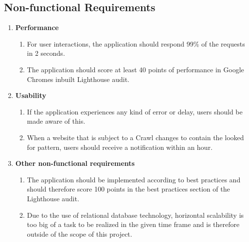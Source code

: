 \documentclass[titlepage, 12pt]{article}
\begin{document}
\subsection{Non-functional Requirements}

\begin{enumerate}
  \item \textbf{Performance}
        \begin{enumerate}
          \item For user interactions, the application should respond 99\% of the requests in 2 seconds.
          \item The application should score at least 40 points of performance in Google Chromes inbuilt Lighthouse audit.
        \end{enumerate}
  \item \textbf{Usability}
        \begin{enumerate}
          \item If the application experiences any kind of error or delay, users should be made aware of this.
          \item When a website that is subject to a Crawl changes to contain the looked for pattern, users should receive a notification within an hour.
        \end{enumerate}
  \item \textbf{Other non-functional requirements}
        \begin{enumerate}
          \item The application should be implemented according to best practices and should therefore score 100 points in the best practices section of the Lighthouse audit.
          \item Due to the use of relational database technology, horizontal scalability is too big of a task to be realized in the given time frame and is therefore outside of the scope of this project.
        \end{enumerate}
\end{enumerate}

\pagebreak

\listoftables
\listoffigures

\pagebreak



\end{document}
